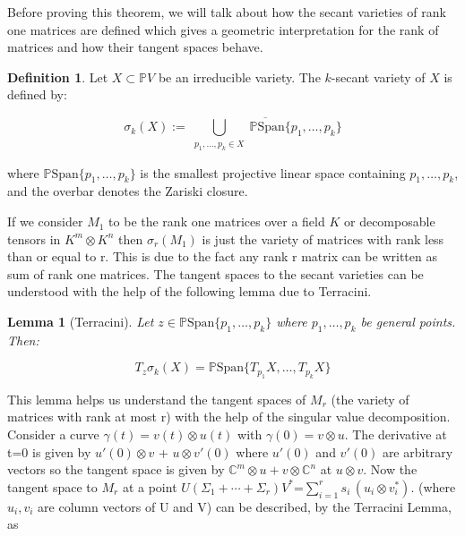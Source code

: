 \documentclass[11pt]{amsart}
\theoremstyle{plain}
\newtheorem{lemma}[theorem]{Lemma}
\theoremstyle{definition}
\newtheorem{definition}[theorem]{Definition}
\theoremstyle{remark}
\begin{document}
Before proving this theorem, we will talk about how the secant varieties of rank one matrices are defined which gives a geometric interpretation for the rank of matrices and how their tangent spaces behave.
\begin{definition}
    Let \( X \subset \mathbb{P}V \) be an irreducible variety. The \( k \)-secant variety of \( X \) is defined by:

\[
\sigma_k(X) := \overline{
\bigcup_{\substack{p_1, \dots, p_k \in X}} 
\mathbb{P} \text{Span} \{ p_1, \dots, p_k \}
}
\]

where \( \mathbb{P} \text{Span} \{ p_1, \dots, p_k \} \) is the smallest projective linear space containing \( p_1, \dots, p_k \), and the overbar denotes the Zariski closure.
\end{definition}
If we consider $M_1$ to be the rank one matrices over a field $K$ or decomposable tensors in $K^m\otimes K^n$ then $\sigma_r(M_1)$ is just the variety of matrices with rank less than or equal to r. This is due to the fact any rank r matrix can be written as sum of rank one matrices. The tangent spaces to the secant varieties can be understood with the help of the following lemma due to Terracini.
\begin{lemma} [Terracini]
    Let \( z \in \mathbb{P} \text{Span} \{ p_1, \dots, p_k \} \) where  $ p_1, \dots, p_k $ be general points. Then:

\[
T_z \sigma_k(X) = \mathbb{P} \text{Span} \{ T_{p_1} X, \dots, T_{p_k} X \}
\]

\end{lemma}
This lemma helps us understand the tangent spaces of $M_r$ (the variety of matrices with rank at most r) with the help of the singular value decomposition. Consider a curve $\gamma(t)=v(t)\otimes u(t)$ with $\gamma(0)=v \otimes u$. The derivative at t=0 is given by $u'(0)\otimes v$ + $u \otimes v'(0)$ where $u'(0)$ and $v'(0)$ are arbitrary vectors so the tangent space is given by $\mathbb{C}^m\otimes u+v\otimes \mathbb{C}^n$ at $u\otimes v$. Now the tangent space to \( M_r \) at a point \( U(\Sigma_1 + \cdots + \Sigma_r)V^* \)=$\sum_{i=1}^r s_i \, (u_i \otimes v_i^*).$ (where $u_i,v_i$ are column vectors of U and V) can be described, by the Terracini Lemma, as
\end{document}
